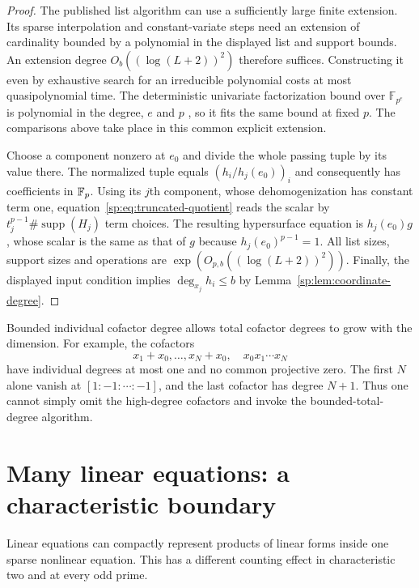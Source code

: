 \begin{proof}
The published list algorithm can use a sufficiently large finite
extension. Its sparse interpolation and constant-variate steps need
an extension of cardinality bounded by a polynomial in the displayed
list and support bounds. An extension degree
$O_b((\log(L+2))^2)$ therefore suffices. Constructing it even by
exhaustive search for an irreducible polynomial costs at most
quasipolynomial time. The deterministic univariate factorization
bound over $\mathbb F_{p^e}$ is polynomial in the degree, $e$ and $p$
\citep[Theorem~2.13]{sp-bkrs}, so it fits the same bound at fixed $p$.
The comparisons above take place in this common explicit extension.

Choose a component nonzero at $e_0$ and divide the whole passing tuple
by its value there. The normalized tuple equals
$(h_i/h_j(e_0))_i$ and consequently has coefficients in $\mathbb F_p$.
Using its $j$th component, whose dehomogenization has constant term
one, equation~\eqref{sp:eq:truncated-quotient} reads the scalar by
$t_j^{p-1}\#\operatorname{supp}(H_j)$ term choices. The resulting
hypersurface equation is $h_j(e_0)g$, whose scalar is the same as
that of $g$ because $h_j(e_0)^{p-1}=1$.
All list sizes, support sizes and operations are
$\exp(O_{p,b}((\log(L+2))^2))$.
Finally, the displayed input condition implies
$\deg_{x_j}h_i\leq b$ by
Lemma~\ref{sp:lem:coordinate-degree}.
\end{proof}

\begin{remark}\label{sp:rem:individual-vs-total}
Bounded individual cofactor degree allows total cofactor degrees to grow
with the dimension. For example, the cofactors
\[
 x_1+x_0,\ldots,x_N+x_0,\quad x_0x_1\cdots x_N
\]
have individual degrees at most one and no common projective zero.
The first $N$ alone vanish at $[1:-1:\cdots:-1]$, and the last
cofactor has degree $N+1$. Thus one cannot simply omit the high-degree
cofactors and invoke the bounded-total-degree algorithm.
\end{remark}

\section{Many linear equations: a characteristic boundary}
\label{sp:sec:linears}
Linear equations can compactly represent products of linear forms inside
one sparse nonlinear equation. This has a different counting effect in
characteristic two and at every odd prime.

